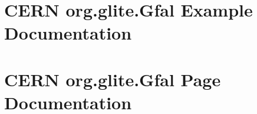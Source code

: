 \documentclass[a4paper]{book}
\begin{document}
\chapter{CERN org.glite.Gfal Example Documentation}






\chapter{CERN org.glite.Gfal Page Documentation}




\printindex
\end{document}
